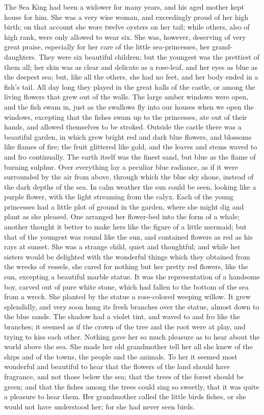 The Sea King had been a widower for many years, and his aged mother kept house for him.
She was a very wise woman, and exceedingly proud of her high birth; on that account she wore twelve oysters on her tail; while others, also of high rank, were only allowed to wear six.
She was, however, deserving of very great praise, especially for her care of the little sea-princesses, her grand-daughters.
They were six beautiful children; but the youngest was the prettiest of them all; her skin was as clear and delicate as a rose-leaf, and her eyes as blue as the deepest sea; but, like all the others, she had no feet, and her body ended in a fish’s tail.
All day long they played in the great halls of the castle, or among the living flowers that grew out of the walls.
The large amber windows were open, and the fish swam in, just as the swallows fly into our houses when we open the windows, excepting that the fishes swam up to the princesses, ate out of their hands, and allowed themselves to be stroked.
Outside the castle there was a beautiful garden, in which grew bright red and dark blue flowers, and blossoms like flames of fire; the fruit glittered like gold, and the leaves and stems waved to and fro continually.
The earth itself was the finest sand, but blue as the flame of burning sulphur.
Over everything lay a peculiar blue radiance, as if it were surrounded by the air from above, through which the blue sky shone, instead of the dark depths of the sea.
In calm weather the sun could be seen, looking like a purple flower, with the light streaming from the calyx.
Each of the young princesses had a little plot of ground in the garden, where she might dig and plant as she pleased.
One arranged her flower-bed into the form of a whale; another thought it better to make hers like the figure of a little mermaid; but that of the youngest was round like the sun, and contained flowers as red as his rays at sunset.
She was a strange child, quiet and thoughtful; and while her sisters would be delighted with the wonderful things which they obtained from the wrecks of vessels, she cared for nothing but her pretty red flowers, like the sun, excepting a beautiful marble statue.
It was the representation of a handsome boy, carved out of pure white stone, which had fallen to the bottom of the sea from a wreck.
She planted by the statue a rose-colored weeping willow.
It grew splendidly, and very soon hung its fresh branches over the statue, almost down to the blue sands.
The shadow had a violet tint, and waved to and fro like the branches; it seemed as if the crown of the tree and the root were at play, and trying to kiss each other.
Nothing gave her so much pleasure as to hear about the world above the sea.
She made her old grandmother tell her all she knew of the ships and of the towns, the people and the animals.
To her it seemed most wonderful and beautiful to hear that the flowers of the land should have fragrance, and not those below the sea; that the trees of the forest should be green; and that the fishes among the trees could sing so sweetly, that it was quite a pleasure to hear them.
Her grandmother called the little birds fishes, or she would not have understood her; for she had never seen birds.

